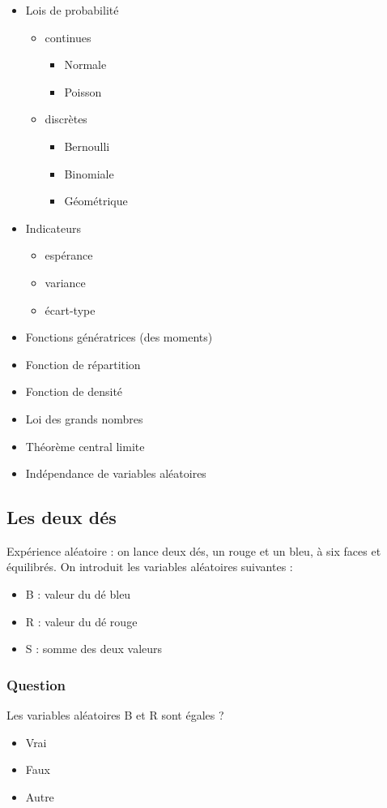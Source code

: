 \documentclass[11pt]{article}
\begin{document}
\begin{itemize}
    \item Lois de probabilité
    \begin{itemize}
        \item continues
        \begin{itemize}
            \item Normale
            \item Poisson
        \end{itemize}
        \item discrètes
        \begin{itemize}
            \item Bernoulli
            \item Binomiale
            \item Géométrique
        \end{itemize}
    \end{itemize}
    \item Indicateurs 
    \begin{itemize}
        \item espérance
        \item variance
        \item écart-type
    \end{itemize}
    \item Fonctions génératrices (des moments)
    \item Fonction de répartition
    \item Fonction de densité
    \item Loi des grands nombres
    \item Théorème central limite
    \item Indépendance de variables aléatoires
\end{itemize}

\subsection{Les deux dés}
Expérience aléatoire : on lance deux dés, un rouge et un bleu, à six faces et
équilibrés.
On introduit les variables aléatoires suivantes :
\begin{itemize}
    \item B : valeur du dé bleu
    \item R : valeur du dé rouge
    \item S : somme des deux valeurs
\end{itemize}

\subsubsection{Question} Les variables aléatoires B et R sont égales ? 
\begin{itemize}
    \item Vrai
    \item Faux
    \item Autre
\end{itemize}
\end{document}
